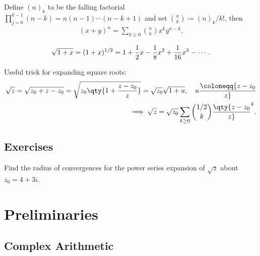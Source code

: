 \begin{fact}

Define \((n)_k\) to be the falling factorial
\(\prod_{j=0}^{k-1} (n-k) = n(n-1)\cdots(n-k+1)\) and set
\({n\choose k} \coloneqq(n)_k/k!\), then
\begin{align*}
(x+y)^n = \sum_{k\geq 0} {n\choose k} x^{k}y^{n-k}
.\end{align*}

\end{fact}

\begin{fact}

\begin{align*}
\sqrt{1+x} = (1+x)^{1/2} = 1 + {1\over 2} x - {1\over 8}x^2 + {1\over 16}x^3 - \cdots
.\end{align*}

\end{fact}

\begin{fact}

Useful trick for expanding square roots:
\begin{align*}
\sqrt{z} = \sqrt{z_0 + z - z_0} = \sqrt{z_0 \qty{ 1 + {z-z_0 \over z} }} = \sqrt{z_0} \sqrt{1+u},\quad u\coloneqq{z-z_0 \over z} \\
\implies \sqrt{z} = \sqrt{z_0} \sum_{k\geq 0} {1/2 \choose k} \qty{z- z_0 \over z}^k
.\end{align*}

\end{fact}

\hypertarget{exercises}{%
\subsection{Exercises}\label{exercises}}

\begin{exercise}[?]

Find the radius of convergences for the power series expansion of
\(\sqrt{z}\) about \(z_0 = 4 +3i\).

\end{exercise}

\hypertarget{preliminaries}{%
\section{Preliminaries}\label{preliminaries}}

\hypertarget{complex-arithmetic}{%
\subsection{Complex Arithmetic}\label{complex-arithmetic}}

